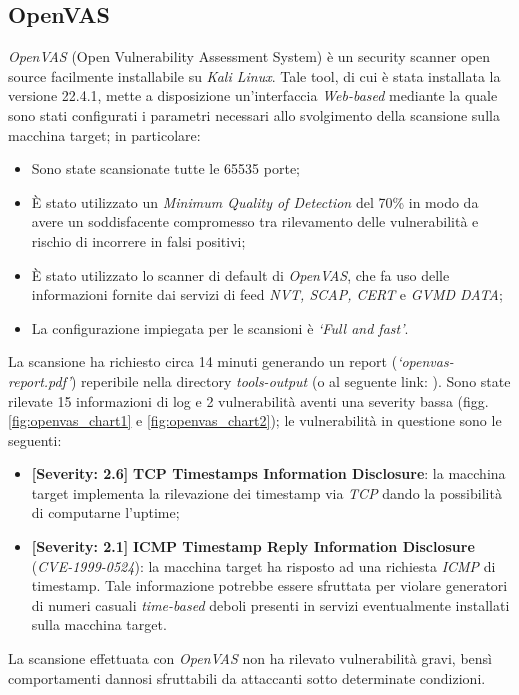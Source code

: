 \subsection{OpenVAS}
\emph{OpenVAS} (Open Vulnerability Assessment System) è un security scanner open source facilmente installabile su \emph{Kali Linux}. Tale tool, di cui è stata installata la versione 22.4.1, mette a disposizione un'interfaccia \emph{Web-based} mediante la quale sono stati configurati i parametri necessari allo svolgimento della scansione sulla macchina target; in particolare:
\begin{itemize} 
    \item Sono state scansionate tutte le 65535 porte;
    \item È stato utilizzato un \emph{Minimum Quality of Detection} del 70\% in modo da avere un soddisfacente compromesso tra rilevamento delle vulnerabilità e rischio di incorrere in falsi positivi;
    \item È stato utilizzato lo scanner di default di \emph{OpenVAS}, che fa uso delle informazioni fornite dai servizi di feed \emph{NVT, SCAP, CERT} e \emph{GVMD DATA};
    \item La configurazione impiegata per le scansioni è \emph{`Full and fast'}.
\end{itemize}
La scansione ha richiesto circa 14 minuti generando un report (\emph{`openvas-report.pdf'}) reperibile nella directory \emph{tools-output} (o al seguente link: ). Sono state rilevate 15 informazioni di log e 2 vulnerabilità aventi una severity bassa (figg. \ref{fig:openvas_chart1} e \ref{fig:openvas_chart2}); le vulnerabilità in questione sono le seguenti:
\begin{itemize}
    \item \textbf{[Severity: 2.6]} \textbf{TCP Timestamps Information Disclosure}: la macchina target implementa la rilevazione dei timestamp via \emph{TCP} dando la possibilità di computarne l'uptime;
    \item \textbf{[Severity: 2.1]} \textbf{ICMP Timestamp Reply Information Disclosure} (\emph{CVE-1999-0524}): la macchina target ha risposto ad una richiesta \emph{ICMP} di timestamp. Tale informazione potrebbe essere sfruttata per violare generatori di numeri casuali \emph{time-based} deboli presenti in servizi eventualmente installati sulla macchina target.
\end{itemize}
La scansione effettuata con \emph{OpenVAS} non ha rilevato vulnerabilità gravi, bensì comportamenti dannosi sfruttabili da attaccanti sotto determinate condizioni.
